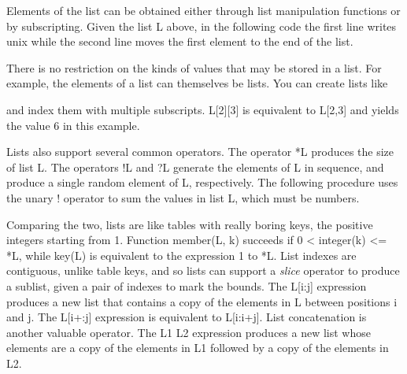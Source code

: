 
Elements of the list can be obtained either through list manipulation
functions or by subscripting. Given the list \textsf{L} above, in the
following code the first line writes
\textsf{{\textquotedbl}unix{\textquotedbl}} while the second line moves
the first element to the end of the list.


There is no restriction on the kinds of values that may be stored in a
list. For example, the elements of a list can themselves be lists. You
can create lists like


\noindent and index them with multiple subscripts. \textsf{L[2][3]} is
equivalent to \textsf{L[2,3]} and yields the value 6 in this example. 

Lists also support several common operators. The operator
\textsf{*L} produces the size of list \textsf{L}.
The operators \textsf{!L} and \textsf{?L} generate the elements of
\textsf{L} in sequence, and produce a single random element of
\textsf{L}, respectively. The following procedure uses the unary
\textsf{!} operator to sum the values in list \textsf{L}, which must be
numbers.


Comparing the two, lists are like tables with really boring keys, the
positive integers starting from 1. Function \textsf{member(L, k)}
succeeds if \textsf{0 {\textless} integer(k) {\textless}= *L}, while
\textsf{key(L)} is equivalent to the expression \textsf{1 to *L}. List
indexes are contiguous, unlike table keys, and so lists can support a
\textit{slice} operator to produce a sublist,
given a pair of indexes to mark the bounds. The \textsf{L[i:j]}
expression produces a new list that contains a copy of the elements in
\textsf{L} between positions \textsf{i} and \textsf{j}. The
\textsf{L[i+:j]} expression is equivalent to \textsf{L[i:i+j]}. List
concatenation is another valuable operator. The \textsf{L1
{\textbar}{\textbar}{\textbar} L2} expression produces a new list whose
elements are a copy of the elements in \textsf{L1} followed by a copy
of the elements in \textsf{L2}.

